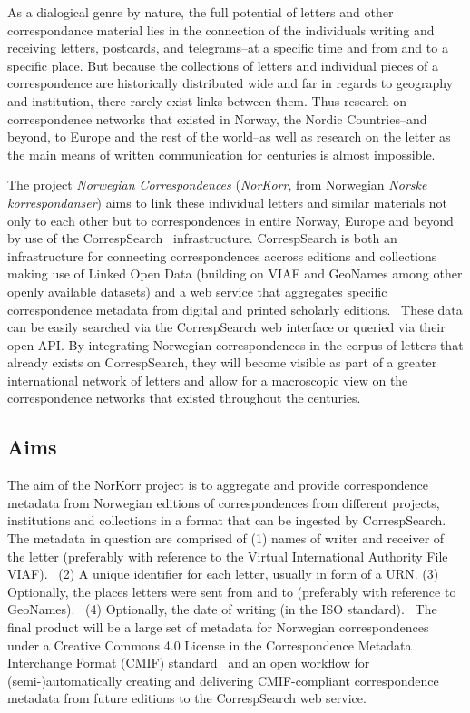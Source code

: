 \documentclass[runningheads]{llncs}
\begin{document}
As a dialogical genre by nature, the full potential of letters and other correspondance material lies in the connection of the individuals writing and receiving letters, postcards, and telegrams--at a specific time and from and to a specific place. But because the collections of letters and individual pieces of a correspondence are historically
distributed wide and far in regards to geography and institution, there rarely exist links between them. Thus research on correspondence
networks that existed in Norway, the Nordic Countries--and beyond, to Europe and the rest of the world--as well as research on the letter as the main means of written communication for centuries is almost
impossible.

The project \textit{Norwegian Correspondences} (\textit{NorKorr}, from Norwegian \textit{Norske korrespondanser}) aims to link these individual letters and similar materials not only to each other but to correspondences in
entire Norway, Europe and beyond by use of the CorrespSearch~\cite{ref_url9}
infrastructure. CorrespSearch is both an infrastructure for connecting correspondences accross editions and collections making use of Linked Open Data (building on VIAF and GeoNames among other openly available datasets) and a web service that aggregates specific correspondence
metadata from digital and printed scholarly
editions.~\cite{ref_article} These data can be easily
searched via the CorrespSearch web interface or queried via their open API. By integrating Norwegian correspondences in the corpus of letters that already exists on CorrespSearch, they will become visible as part of a greater international network of letters and allow for a
macroscopic view on the correspondence networks that existed throughout the centuries.

\subsection{Aims}
The aim of the NorKorr project is to aggregate and provide
correspondence metadata from Norwegian editions of correspondences from
different projects, institutions and collections in a format that can be
ingested by CorrespSearch. The metadata in question are comprised of (1)
names of writer and receiver of the letter (preferably with reference to
the Virtual International Authority File
VIAF).~\cite{ref_url3} (2) A unique identifier for each
letter, usually in form of a URN. (3) Optionally, the places letters
were sent from and to (preferably with reference to
GeoNames).~\cite{ref_url4} (4) Optionally, the date of
writing (in the ISO standard).~\cite{ref_url5} The final
product will be a large set of metadata for Norwegian correspondences
under a Creative Commons 4.0 License in the 
Correspondence
Metadata Interchange Format (CMIF) standard~\cite{ref_url10} and an open workflow for
(semi-)automatically creating and delivering CMIF-compliant
correspondence metadata from future editions to the
CorrespSearch web service.
\end{document}
